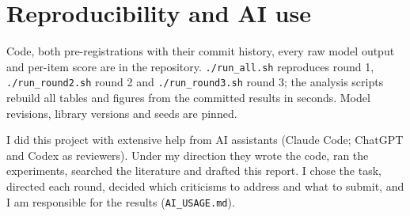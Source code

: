 \documentclass[10pt,a4paper]{article}
\newcommand{\code}[1]{{\small\texttt{#1}}}
\begin{document}
\section{Reproducibility and AI use}
Code, both pre-registrations with their commit history, every raw model output and per-item score are in the repository. \code{./run\_all.sh} reproduces round 1, \code{./run\_round2.sh} round 2 and \code{./run\_round3.sh} round 3; the analysis scripts rebuild all tables and figures from the committed results in seconds.
Model revisions, library versions and seeds are pinned.

I did this project with extensive help from AI assistants (Claude Code; ChatGPT and Codex as reviewers). Under my direction they wrote the code, ran the experiments, searched the literature and drafted this report. I chose the task, directed each round, decided which criticisms to address and what to submit, and I am responsible for the results (\code{AI\_USAGE.md}).
\end{document}
